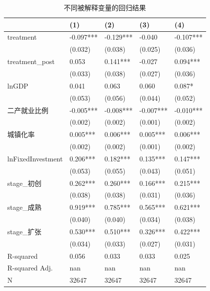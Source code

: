 \begin{table}
\caption{不同被解释变量的回归结果}
\label{}
\begin{center}
\begin{tabular}{lllll}
\hline
                  & (1)       & (2)       & (3)       & (4)        \\
\hline
treatment         & -0.097*** & -0.129*** & -0.040    & -0.107***  \\
                  & (0.032)   & (0.038)   & (0.025)   & (0.036)    \\
treatment\_post   & 0.053     & 0.141***  & -0.027    & 0.094***   \\
                  & (0.033)   & (0.038)   & (0.027)   & (0.036)    \\
lnGDP             & 0.041     & 0.063     & 0.060     & 0.087*     \\
                  & (0.053)   & (0.056)   & (0.044)   & (0.052)    \\
二产就业比例            & -0.005*** & -0.008*** & -0.007*** & -0.010***  \\
                  & (0.002)   & (0.002)   & (0.001)   & (0.002)    \\
城镇化率              & 0.005***  & 0.006***  & 0.005***  & 0.006***   \\
                  & (0.002)   & (0.002)   & (0.001)   & (0.002)    \\
lnFixedInvestment & 0.206***  & 0.182***  & 0.135***  & 0.147***   \\
                  & (0.053)   & (0.055)   & (0.043)   & (0.051)    \\
stage\_初创         & 0.262***  & 0.260***  & 0.166***  & 0.215***   \\
                  & (0.038)   & (0.038)   & (0.031)   & (0.036)    \\
stage\_成熟         & 0.919***  & 0.785***  & 0.565***  & 0.621***   \\
                  & (0.040)   & (0.040)   & (0.034)   & (0.038)    \\
stage\_扩张         & 0.530***  & 0.510***  & 0.326***  & 0.422***   \\
                  & (0.034)   & (0.033)   & (0.027)   & (0.031)    \\
R-squared         & 0.056     & 0.033     & 0.033     & 0.025      \\
R-squared Adj.    & nan       & nan       & nan       & nan        \\
N                 & 32647     & 32647     & 32647     & 32647      \\
\hline
\end{tabular}
\end{center}
\end{table}
